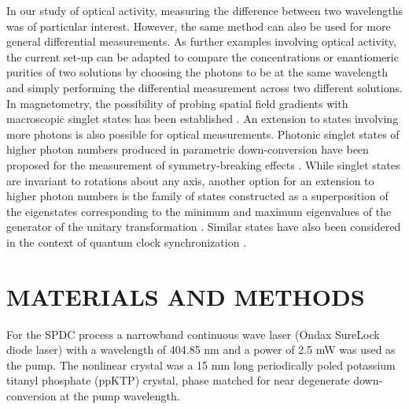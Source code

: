 \documentclass[12pt,preprint]{revtex4}
\begin{document}
In our study of optical activity, measuring the difference between two wavelengths was of particular interest. However, the same method can also be used for more general differential measurements. As further examples involving optical activity, the current set-up can be adapted to compare the concentrations or enantiomeric purities of two solutions by choosing the photons to be at the same wavelength and simply performing the differential measurement across two different solutions.
 In magnetometry, the possibility of probing spatial field gradients with macroscopic singlet states has been established \citep{Toth2014,Urizar-Lanz2013}. 
An extension to states involving more photons is also possible for optical measurements. Photonic singlet states of higher photon numbers produced in parametric down-conversion have been proposed for the measurement of symmetry-breaking effects \citep{Cable2010}. While singlet states are invariant to rotations about any axis, another option for an extension to higher photon numbers is the family of states constructed as a superposition of the eigenstates corresponding to the minimum and maximum eigenvalues of the generator of the unitary transformation \citep{Giovannetti2011,Giovannetti2006,Zwierz2012}. Similar states have also been considered in the context of quantum clock synchronization \citep{Jozsa2000,Zhang2013}.

\section*{MATERIALS AND METHODS} \nonumber \label{Methods}
For the SPDC process a narrowband continuous wave laser (Ondax SureLock diode laser) with a wavelength of 404.85 nm and a power of 2.5 mW was used as the pump. The nonlinear crystal was a 15 mm long periodically poled potassium titanyl phosphate (ppKTP) crystal, phase matched for near degenerate down-conversion at the pump wavelength. 
\end{document}
